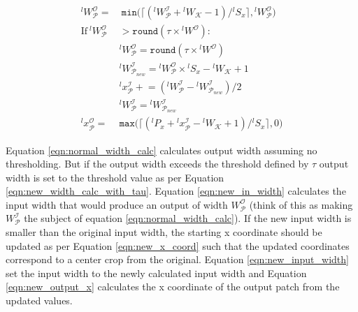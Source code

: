\begin{align}
\label{eqn:normal_width_calc}
{}^lW^\mathcal{O}_\mathcal{P} = &~ \texttt{min}\big(\lceil ({}^lW^\mathcal{I}_\mathcal{P} + {}^lW_\mathcal{K} - 1)/{}^lS_x \rceil, {}^lW^\mathcal{O}_\mathcal{P}\big)\\
\label{eqn:check_tau}
\text{If}~ {}^lW_\mathcal{P}^\mathcal{O} & > \texttt{round}(\tau \times {}^lW^\mathcal{O}):\\
\label{eqn:new_width_calc_with_tau}
& {}^lW^\mathcal{O}_\mathcal{P} = \texttt{round}(\tau \times {}^lW^\mathcal{O})\\
\label{eqn:new_in_width}
& {}^lW^\mathcal{I}_{\mathcal{P}_{new}} = {}^lW^\mathcal{O}_{\mathcal{P}} \times {}^lS_x - {}^lW_{\mathcal{K}} + 1\\
\label{eqn:new_x_coord}
& {}^lx^{\mathcal{I}}_\mathcal{P} \mathrel{+}= ({}^lW^\mathcal{I}_\mathcal{P} - {}^lW^\mathcal{I}_{\mathcal{P}_{new}})/2\\
\label{eqn:new_input_width}
& {}^lW^\mathcal{I}_{\mathcal{P}} = {}^lW^\mathcal{I}_{\mathcal{P}_{new}}\\
\label{eqn:new_output_x}
{}^lx^\mathcal{O}_\mathcal{P} = & \texttt{max}\big(\lceil ({}^lP_x + {}^lx^\mathcal{I}_\mathcal{P} - {}^lW_\mathcal{K} + 1)/{}^lS_x \rceil, 0\big)
\end{align}

Equation \ref{eqn:normal_width_calc} calculates output width assuming no thresholding.
But if the output width exceeds the threshold defined by $\tau$ output width is set to the threshold value as per Equation \ref{eqn:new_width_calc_with_tau}.
Equation \ref{eqn:new_in_width} calculates the input width that would produce an output of width $W^\mathcal{O}_\mathcal{P}$ (think of this as making $W^{\mathcal{I}}_{\mathcal{P}}$ the subject of equation \ref{eqn:normal_width_calc}).
If the new input width is smaller than the original input width, the starting x coordinate should be updated as per Equation \ref{eqn:new_x_coord} such that the updated coordinates correspond to a center crop from the original.
Equation \ref{eqn:new_input_width} set the input width to the newly calculated input width and Equation \ref{eqn:new_output_x} calculates the x coordinate of the output patch from the updated values.

